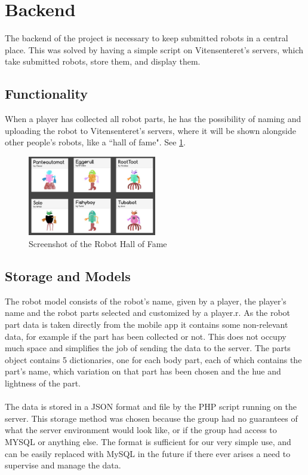 \section{Backend}
The backend of the project is necessary to keep submitted robots in a central place. This was solved by having a simple script on Vitensenteret's servers, which take submitted robots, store them, and display them.

\subsection{Functionality}
When a player has collected all robot parts, he has the possibility of naming and uploading the robot to Vitensenteret's servers, where it will be shown alongside other people's robots, like a ``hall of fame". See \ref{fig:robots_backend}.

\begin{figure}[H]
    \centering
    \includegraphics[width=0.5\textwidth]{images/app/robots_backend.jpg}
    \caption{Screenshot of the Robot Hall of Fame}
    \label{fig:robots_backend}
\end{figure}


\subsection{Storage and Models}
The robot model consists of the robot's name, given by a player, the player's name and the robot parts selected and customized by a player.r. 
As the robot part data is taken directly from the mobile app it contains some non-relevant data, for example if the part has been collected or not. 
This does not occupy much space and simplifies the job of sending the data to the server. The parts object contains 5 dictionaries, one for each body part, each of which contains the part's name, which variation on that part has been chosen and the hue and lightness of the part.
\\
\\
The data is stored in a JSON format and file by the PHP script running on the server. This storage method was chosen because the group had no guarantees of what the server environment would look like, or if the group had access to MYSQL or anything else. The format is sufficient for our very simple use, and can be easily replaced with MySQL in the future if there ever arises a need to supervise and manage the data.

